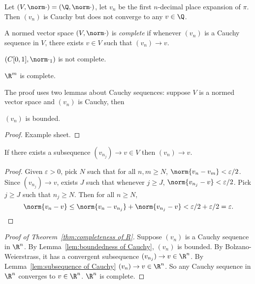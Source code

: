 \documentclass[a4paper]{article}
\theoremstyle{definition}
\begin{document}
\begin{eg}
  Let \((V, \norm \cdot) = (\Q, \norm \cdot)\), let \(v_n\) be the first \(n\)-decimal place expansion of \(\pi\). Then \((v_n)\) is Cauchy but does not converge to any \(v\in \Q\).
\end{eg}

\begin{definition}[Completeness]
  A normed vector space \((V, \norm \cdot)\) is \emph{complete} if whenever \((v_n)\) is a Cauchy sequence in \(V\), there exists \(v\in V\) such that \((v_n) \to v\).
\end{definition}

\begin{eg}
  \((C[0, 1], \norm \cdot_1)\) is not complete.
\end{eg}

\begin{theorem}
  \label{thm:completeness of R}
  \(\R^m\) is complete.
\end{theorem}

The proof uses two lemmas about Cauchy sequences: suppose \(V\) is a normed vector space and \((v_n)\) is Cauchy, then

\begin{lemma}
  \label{lem:boundedness of Cauchy}
  \((v_n)\) is bounded.
\end{lemma}

\begin{proof}
  Example sheet.
\end{proof}

\begin{lemma}
  \label{lem:subsequence of Cauchy}
  If there exists a subsequence \((v_{n_j}) \to v \in V\) then \((v_n) \to v\).
\end{lemma}

\begin{proof}
  Given \(\varepsilon > 0\), pick \(N\) such that for all \(n, m \geq N\), \(\norm{v_n - v_m} < \varepsilon/2\). Since \((v_{n_j}) \to v\), exists \(J\) such that whenever \(j \geq J\), \(\norm{v_{n_j} - v} < \varepsilon/2\). Pick \(j \geq J\) such that \(n_j \geq N\). Then for all \(n\geq N\),
  \[
    \norm{v_n - v} \leq \norm{v_n - v_{n_j}} + \norm{v_{n_j} - v} < \varepsilon/2 + \varepsilon/2 = \varepsilon.
  \]
\end{proof}

\begin{proof}[Proof of Theorem~\ref{thm:completeness of R}]
  Suppose \((v_n)\) is a Cauchy sequence in \(\R^n\). By Lemma~\ref{lem:boundedness of Cauchy}, \((v_n)\) is bounded. By Bolzano-Weierstrass, it has a convergent subsequence \((v_{n_j}) \to v \in \R^n\). By Lemma~\ref{lem:subsequence of Cauchy} \((v_n) \to v \in \R^n\). So any Cauchy sequence in \(\R^n\) converges to \(v\in \R^n\). \(\R^n\) is complete.
\end{proof}
\end{document}
